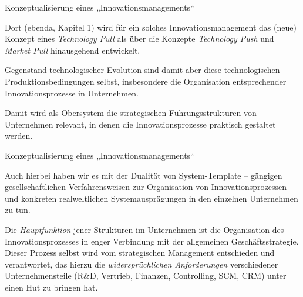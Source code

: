 \documentclass{beamer}
\begin{document}
\begin{frame}{Konzeptualisierung eines „Innovationsmanagements“}

Dort (ebenda, Kapitel 1) wird für ein solches Innovationsmanagement das (neue)
Konzept eines \emph{Technology Pull} als über die Konzepte \emph{Technology
  Push} und \emph{Market Pull} hinausgehend entwickelt.

Gegenstand technologischer Evolution sind damit aber diese technologischen
Produktionsbedingungen selbst, insbesondere die Organisation entsprechender
Innovationsprozesse in Unternehmen.

Damit wird als Obersystem die strategischen Führungsstrukturen von Unternehmen
relevant, in denen die Innovationsprozesse praktisch gestaltet werden.

\end{frame}

\begin{frame}{Konzeptualisierung eines „Innovationsmanagements“}
  
Auch hierbei haben wir es mit der Dualität von System-Template -- gängigen
gesellschaftlichen Verfahrensweisen zur Organisation von Innovationsprozessen
-- und konkreten realweltlichen Systemausprägungen in den einzelnen
Unternehmen zu tun.

Die \emph{Hauptfunktion} jener Strukturen im Unternehmen ist die Organisation
des Innovationsprozesses in enger Verbindung mit der allgemeinen
Geschäftsstrategie.  Dieser Prozess selbst wird vom strategischen Management
entschieden und verantwortet, das hierzu die \emph{widersprüchlichen
  Anforderungen} verschiedener Unternehmensteile (R\&D, Vertrieb, Finanzen,
Controlling, SCM, CRM) unter einen Hut zu bringen hat.

\end{frame}
\end{document}
